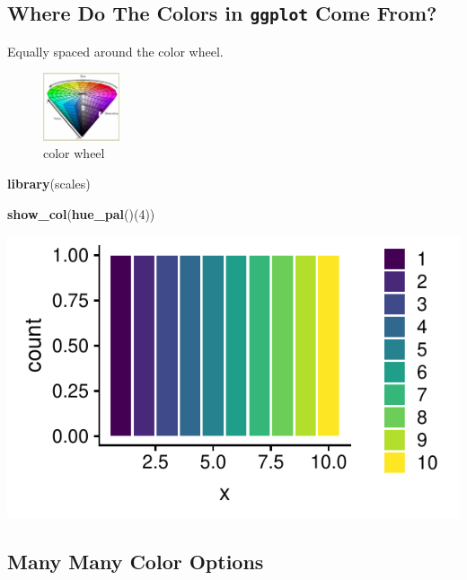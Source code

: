 \documentclass[]{tufte-handout}
\newenvironment{Shaded}{\begin{snugshade}}{\end{snugshade}}
\newcommand{\DecValTok}[1]{\textcolor[rgb]{0.00,0.00,0.81}{#1}}
\newcommand{\KeywordTok}[1]{\textcolor[rgb]{0.13,0.29,0.53}{\textbf{#1}}}
\newcommand{\NormalTok}[1]{#1}
\begin{document}
\newpage

\hypertarget{where-do-the-colors-in-ggplot-come-from}{%
\subsection{\texorpdfstring{Where Do The Colors in \texttt{ggplot} Come
From?}{Where Do The Colors in ggplot Come From?}}\label{where-do-the-colors-in-ggplot-come-from}}

Equally spaced around the color wheel.

\begin{figure}
\centering
\includegraphics[width=0.2\textwidth,height=\textheight]{colorwheel.png}
\caption{color wheel}
\end{figure}

\begin{Shaded}
\begin{Highlighting}[]
\KeywordTok{library}\NormalTok{(scales)}

\KeywordTok{show_col}\NormalTok{(}\KeywordTok{hue_pal}\NormalTok{()(}\DecValTok{4}\NormalTok{))}
\end{Highlighting}
\end{Shaded}

\begin{marginfigure}
\includegraphics{design_files/figure-latex/unnamed-chunk-7-1} \end{marginfigure}

\hypertarget{many-many-color-options}{%
\subsection{Many Many Color Options}\label{many-many-color-options}}
\end{document}
